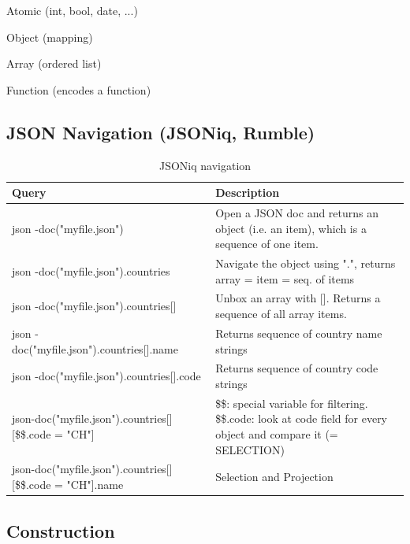 \documentclass[11pt,oneside,a4paper]{article}
\begin{document}
{\begin{compactitem}
\item Atomic (int, bool, date, ...)
\item Object (mapping)
\item Array (ordered list)
\item Function (encodes a function)
\end{compactitem}

\newpage

\subsection{JSON Navigation (JSONiq, Rumble)}

\begin{table}[hb!]
\begin{tabular}{|p{100mm}|p{80mm}|}
	\hline 
	Query & Description \\ 
	\hline 
	json
	-doc("myfile.json") & Open a JSON doc and returns an object (i.e. an item), which is a sequence of one item. \\ 
	\hline 
	json
	-doc("myfile.json").countries & Navigate the object using ".", returns array = item = seq. of items \\ 
	\hline 
	json
	-doc("myfile.json").countries[] & Unbox an array with []. Returns a sequence of all array items. \\ 
	\hline 
	json
	-doc("myfile.json").countries[].name & Returns sequence of country name strings \\ 
	\hline 
	json
	-doc("myfile.json").countries[].code & Returns sequence of country code strings \\ 
	\hline 
	json-doc("myfile.json").countries[][\$\$.code = "CH"] & \$\$: special variable for filtering. \$\$.code: look at code field for every object and compare it (= SELECTION) \\ 
	\hline 
	json-doc("myfile.json").countries[][\$\$.code = "CH"].name & Selection and Projection \\ 
	\hline 
	\end{tabular}
	\caption{JSONiq navigation}
\end{table}

\subsection{Construction}

}
\end{document}
